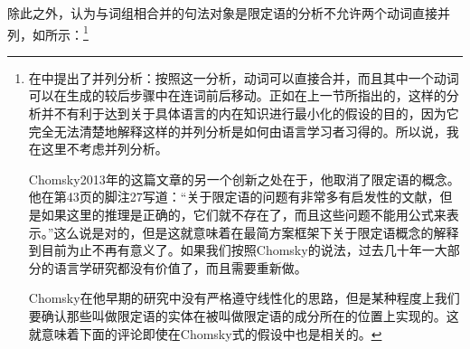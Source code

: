 除此之外，认为与词组相合并的句法对象是限定语的分析不允许两个动词直接并列，如所示：\footnote{\label{fn-Chomsky-on-Specifiers}%
 \citet[]{Chomsky2013a}在中提出了并列分析：按照这一分析，动词可以直接合并，而且其中一个动词可以在生成的较后步骤中在连词前后移动。正如在上一节所指出的，这样的分析并不有利于达到关于具体语言的内在知识进行最小化的假设的目的，因为它完全无法清楚地解释这样的并列分析是如何由语言学习者习得的。所以说，我在这里不考虑并列分析。

Chomsky2013年的这篇文章的另一个创新之处在于，他取消了限定语的概念。他在第43页的脚注27写道：“关于限定语的问题有非常多有启发性的文献，但是如果这里的推理是正确的，它们就不存在了，而且这些问题不能用公式来表示。”这么说是对的，但是这就意味着在最简方案框架下关于限定语概念的解释到目前为止不再有意义了。如果我们按照Chomsky的说法，过去几十年一大部分的语言学研究都没有价值了，而且需要重新做。

Chomsky在他早期的研究中没有严格遵守线性化的思路，但是某种程度上我们要确认那些叫做限定语的实体在被叫做限定语的成分所在的位置上实现的。这就意味着下面的评论即使在Chomsky式的假设中也是相关的。
}


